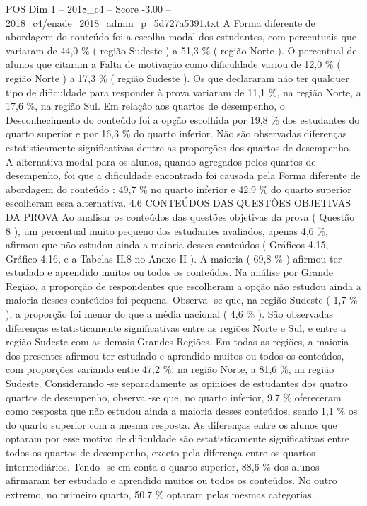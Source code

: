 \begin{textsample}{POS Dim 1 – 2018\_c4 – Score -3.00 – 2018\_c4/enade\_2018\_admin\_p\_5d727a5391.txt}
A Forma diferente de abordagem do conteúdo foi a escolha modal dos estudantes, com percentuais que variaram de 44,0 \% ( região Sudeste ) a 51,3 \% ( região Norte ).
O percentual de alunos que citaram a Falta de motivação como dificuldade variou de 12,0 \% ( região Norte ) a 17,3 \% ( região Sudeste ).
Os que declararam não ter qualquer tipo de dificuldade para responder à prova variaram de 11,1 \%, na região Norte, a 17,6 \%, na região Sul.
Em relação aos quartos de desempenho, o Desconhecimento do conteúdo foi a opção escolhida por 19,8 \% dos estudantes do quarto superior e por 16,3 \% do quarto inferior.
Não são observadas diferenças estatisticamente significativas dentre as proporções dos quartos de desempenho.
A alternativa modal para os alunos, quando agregados pelos quartos de desempenho, foi que a dificuldade encontrada foi causada pela Forma diferente de abordagem do conteúdo : 49,7 \% no quarto inferior e 42,9 \% do quarto superior escolheram essa alternativa. 4.6 CONTEÚDOS DAS QUESTÕES OBJETIVAS DA PROVA Ao analisar os conteúdos das questões objetivas da prova ( Questão 8 ), um percentual muito pequeno dos estudantes avaliados, apenas 4,6 \%, afirmou que não estudou ainda a maioria desses conteúdos ( Gráficos 4.15, Gráfico 4.16, e a Tabelas II.8 no Anexo II ).
A maioria ( 69,8 \% ) afirmou ter estudado e aprendido muitos ou todos os conteúdos.
Na análise por Grande Região, a proporção de respondentes que escolheram a opção não estudou ainda a maioria desses conteúdos foi pequena.
Observa -se que, na região Sudeste ( 1,7 \% ), a proporção foi menor do que a média nacional ( 4,6 \% ).
São observadas diferenças estatisticamente significativas entre as regiões Norte e Sul, e entre a região Sudeste com as demais Grandes Regiões.
Em todas as regiões, a maioria dos presentes afirmou ter estudado e aprendido muitos ou todos os conteúdos, com proporções variando entre 47,2 \%, na região Norte, a 81,6 \%, na região Sudeste.
Considerando -se separadamente as opiniões de estudantes dos quatro quartos de desempenho, observa -se que, no quarto inferior, 9,7 \% ofereceram como resposta que não estudou ainda a maioria desses conteúdos, sendo 1,1 \% os do quarto superior com a mesma resposta.
As diferenças entre os alunos que optaram por esse motivo de dificuldade são estatisticamente significativas entre todos os quartos de desempenho, exceto pela diferença entre os quartos intermediários.
Tendo -se em conta o quarto superior, 88,6 \% dos alunos afirmaram ter estudado e aprendido muitos ou todos os conteúdos.
No outro extremo, no primeiro quarto, 50,7 \% optaram pelas mesmas categorias.

\end{textsample}
